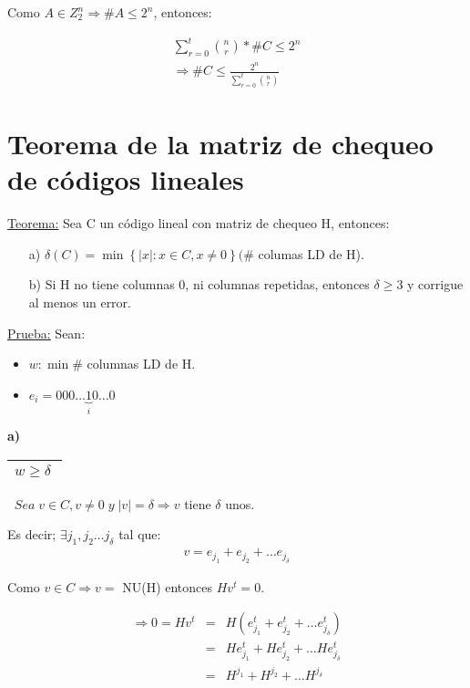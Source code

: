 \documentclass[12pt,a4paper]{report}
\newcounter{neq}
\begin{document}
		Como $A \in Z_{2}^{n} \Rightarrow \# A \leq 2^{n}$, entonces:
		
		\begin{eqnarray}
			\nonumber \sum_{r = 0}^{t} {n \choose r} * \# C \leq 2^{n} \\
			\nonumber \Rightarrow \# C \leq \frac{2^{n}}{\sum_{r = 0}^{t} {n \choose r}}
		\end{eqnarray}
		 
	\section{Teorema de la matriz de chequeo de códigos lineales}
	
		\underline{Teorema:} Sea C un código lineal con matriz de chequeo H, entonces:
		\begin{itemize}
			\item[a)] $\delta(C) = \min \left\lbrace \lvert x \rvert : x \in C , x \neq 0 \right\rbrace (\#$ columas LD de H).		
			\item[b)] Si H no tiene columnas 0, ni columnas repetidas, entonces $\delta \geq 3$ y corrigue al menos un error.
		\end{itemize}
		
		\underline{Prueba:} Sean:
		\begin{itemize}
			\item $w : \min \#$ columnas LD de H.
			\item $e_{i} = 000 \dotsc \underbrace{1}_{i} 0 \dotsc 0$ 
		\end{itemize}
		
		\textbf{a)} \begin{tabular}{|c|} \hline $w \geq \delta \; $ \\ \hline \end{tabular} $ \; \; Sea \; v \in C , v \neq 0 \; y \; \lvert v \rvert = \delta \Rightarrow v$ tiene $\delta$ unos.
		
		\vspace{3mm}
		Es decir; $\exists j_{1}, j_{2} \dotsc j_{\delta}$ tal que:
		\begin{eqnarray}
			\nonumber v = e_{j_{1}} + e_{j_{2}} + \dotsc e_{j_{\delta}}
		\end{eqnarray}
		
		Como $ v \in C \Rightarrow v =$ NU(H) entonces $Hv^{t} = 0$.
		
		\begin{eqnarray}
			\nonumber \Rightarrow 0 = Hv^{t} &=& H(e_{j_{1}}^{t} + e_{j_{2}}^{t} + \dotsc e_{j_{\delta}}^{t}) \\
			\nonumber &=& H e_{j_{1}}^{t} + H e_{j_{2}}^{t} + \dotsc H e_{j_{\delta}}^{t} \\
			\nonumber &=& H^{j_{1}} + H^{j_{2}} + \dotsc H^{j_{\delta}}
		\end{eqnarray}
		
\end{document}
